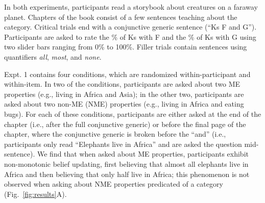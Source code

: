 \documentclass[letterpaper, 12pt]{article}
\begin{document}

In both experiments, participants read a storybook about creatures on a faraway planet. Chapters of the book consist of a few sentences teaching about the category. Critical trials end with a conjunctive generic sentence (``Ks F and G''). Participants are asked to rate the \% of Ks with F and the \% of Ks with G using two slider bars ranging from 0\% to 100\%. Filler trials contain sentences using quantifiers \emph{all}, \emph{most}, and \emph{none}.%

Expt. 1 contains four conditions, which are randomized within-participant and within-item. In two of the conditions, participants are asked about two ME properties (e.g., living in Africa and Asia); in the other two, participants are asked about two non-ME (NME) properties (e.g., living in Africa and eating bugs). For each of these conditions, participants are either asked at the end of the chapter (i.e., after the full conjunctive generic) or before the final page of the chapter, where the conjunctive generic is broken before the ``and'' (i.e., participants only read ``Elephants live in Africa'' and are asked the question mid-sentence). We find that when asked about ME properties, participants exhibit non-monotonic belief updating, first believing that almost all elephants live in Africa and then believing that only half live in Africa; this phenomenon is not observed when asking about NME properties predicated of a category (Fig.~\ref{fig:results}A).
\end{document}
